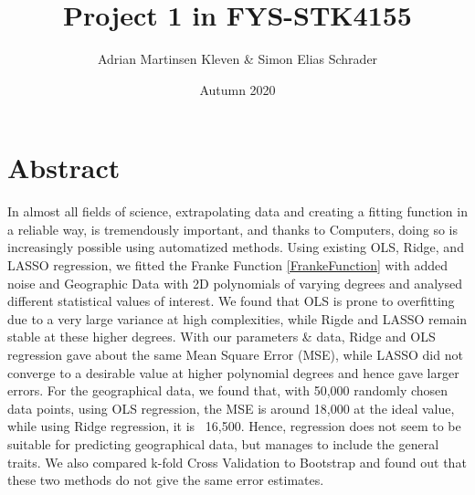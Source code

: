 \documentclass[11pt,a4paper,titlepage]{article}
\title{Project 1 in FYS-STK4155}
\author{Adrian Martinsen Kleven & Simon Elias Schrader }
\date{Autumn 2020}
\begin{document}
\maketitle
\tableofcontents
\listoffigures
\listoftables

\clearpage
\section{Abstract}
In almost all fields of science, extrapolating data and creating a fitting function in a reliable way, is tremendously important, and thanks to Computers, doing so is increasingly possible using automatized methods. Using existing OLS, Ridge, and LASSO regression, we fitted the Franke Function \eqref{FrankeFunction} with added noise and Geographic Data with 2D polynomials of varying degrees and analysed different statistical values of interest. We found that OLS is prone to overfitting due to a very large variance at high complexities, while Rigde and LASSO remain stable at these higher degrees. With our parameters \& data, Ridge and OLS regression gave about the same Mean Square Error (MSE), while LASSO did not converge to a desirable value at higher polynomial degrees and hence gave larger errors. For the geographical data, we found that, with 50,000 randomly chosen data points, using  OLS regression, the MSE is around 18,000 at the ideal value, while using Ridge regression, it is ~16,500. Hence, regression does not seem to be suitable for predicting geographical data, but manages to include the general traits. We also compared k-fold Cross Validation to Bootstrap and found out that these two methods do not give the same error estimates. 

\end{document}
